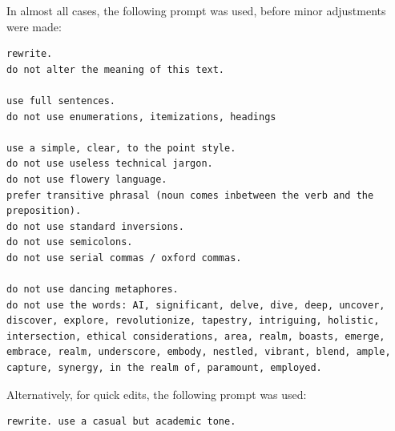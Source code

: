 \documentclass[a4paper, oneside]{discothesis}
\begin{document}
In almost all cases, the following prompt was used, before minor adjustments were made:

\begin{verbatim}
rewrite.
do not alter the meaning of this text.

use full sentences.
do not use enumerations, itemizations, headings

use a simple, clear, to the point style.
do not use useless technical jargon.
do not use flowery language.
prefer transitive phrasal (noun comes inbetween the verb and the preposition).
do not use standard inversions.
do not use semicolons.
do not use serial commas / oxford commas.

do not use dancing metaphores.
do not use the words: AI, significant, delve, dive, deep, uncover, discover, explore, revolutionize, tapestry, intriguing, holistic, intersection, ethical considerations, area, realm, boasts, emerge, embrace, realm, underscore, embody, nestled, vibrant, blend, ample, capture, synergy, in the realm of, paramount, employed.
\end{verbatim}

Alternatively, for quick edits, the following prompt was used:

\begin{verbatim}
rewrite. use a casual but academic tone.
\end{verbatim}
\end{document}
